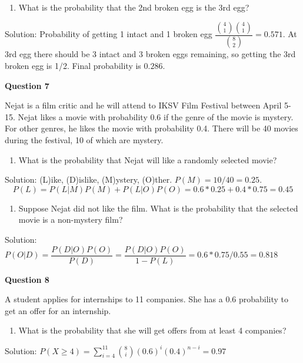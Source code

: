 \documentclass[]{book}
\providecommand{\tightlist}{%
  \setlength{\itemsep}{0pt}\setlength{\parskip}{0pt}}
\theoremstyle{definition}
\theoremstyle{definition}
\theoremstyle{definition}
\theoremstyle{remark}
\begin{document}
\begin{enumerate}
\def\labelenumi{\alph{enumi})}
\setcounter{enumi}{1}
\tightlist
\item
  What is the probability that the 2nd broken egg is the 3rd egg?
\end{enumerate}

Solution: Probability of getting 1 intact and 1 broken egg
\(\dfrac{\binom{4}{1}\binom{4}{1}}{\binom{8}{2}} = 0.571\). At 3rd egg
there should be 3 intact and 3 broken eggs remaining, so getting the 3rd
broken egg is 1/2. Final probability is \(0.286\).

\textbf{Question 7}

Nejat is a film critic and he will attend to IKSV Film Festival between
April 5-15. Nejat likes a movie with probability 0.6 if the genre of the
movie is mystery. For other genres, he likes the movie with probability
0.4. There will be 40 movies during the festival, 10 of which are
mystery.

\begin{enumerate}
\def\labelenumi{\alph{enumi})}
\tightlist
\item
  What is the probability that Nejat will like a randomly selected
  movie?
\end{enumerate}

Solution: (L)ike, (D)islike, (M)ystery, (O)ther.
\(P(M) = 10/40 = 0.25\).
\[P(L) = P(L|M)P(M) + P(L|O)P(O) = 0.6*0.25 + 0.4*0.75 = 0.45\]

\begin{enumerate}
\def\labelenumi{\alph{enumi})}
\setcounter{enumi}{1}
\tightlist
\item
  Suppose Nejat did not like the film. What is the probability that the
  selected movie is a non-mystery film?
\end{enumerate}

Solution:
\(P(O|D) = \dfrac{P(D|O)P(O)}{P(D)} = \dfrac{P(D|O)P(O)}{1-P(L)} = 0.6*0.75/0.55 = 0.818\)

\textbf{Question 8}

A student applies for internships to 11 companies. She has a 0.6
probability to get an offer for an internship.

\begin{enumerate}
\def\labelenumi{\alph{enumi})}
\tightlist
\item
  What is the probability that she will get offers from at least 4
  companies?
\end{enumerate}

Solution:
\(P(X \ge 4) = \sum_{i=4}^{11} \binom{8}{i} (0.6)^i(0.4)^{n-i} = 0.97\)
\end{document}
